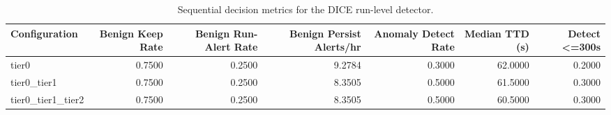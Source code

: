 \begin{table}[t]
\centering
\caption{Sequential decision metrics for the DICE run-level detector.}
\label{tab:dice_sequential_metrics}
\footnotesize
\begin{tabular}{lrrrrrr}
\toprule
Configuration & Benign Keep Rate & Benign Run-Alert Rate & Benign Persist Alerts/hr & Anomaly Detect Rate & Median TTD (s) & Detect <=300s \\
\midrule
tier0 & 0.7500 & 0.2500 & 9.2784 & 0.3000 & 62.0000 & 0.2000 \\
tier0_tier1 & 0.7500 & 0.2500 & 8.3505 & 0.5000 & 61.5000 & 0.3000 \\
tier0_tier1_tier2 & 0.7500 & 0.2500 & 8.3505 & 0.5000 & 60.5000 & 0.3000 \\
\bottomrule
\end{tabular}

\end{table}
